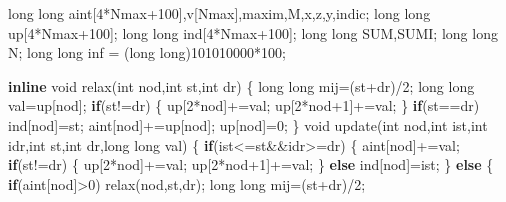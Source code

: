 \documentclass[10pt,]{article}
\newenvironment{Shaded}{}{}
\newcommand{\KeywordTok}[1]{\textcolor[rgb]{0.00,0.44,0.13}{\textbf{{#1}}}}
\newcommand{\DataTypeTok}[1]{\textcolor[rgb]{0.56,0.13,0.00}{{#1}}}
\newcommand{\DecValTok}[1]{\textcolor[rgb]{0.25,0.63,0.44}{{#1}}}
\newcommand{\NormalTok}[1]{{#1}}
\begin{document}
\begin{Shaded}
\begin{Highlighting}[]
\DataTypeTok{long} \DataTypeTok{long} \NormalTok{aint[}\DecValTok{4}\NormalTok{*Nmax}\DecValTok{+100}\NormalTok{],v[Nmax],maxim,M,x,z,y,indic;}
\DataTypeTok{long} \DataTypeTok{long} \NormalTok{up[}\DecValTok{4}\NormalTok{*Nmax}\DecValTok{+100}\NormalTok{];}
\DataTypeTok{long} \DataTypeTok{long} \NormalTok{ind[}\DecValTok{4}\NormalTok{*Nmax}\DecValTok{+100}\NormalTok{];}
\DataTypeTok{long} \DataTypeTok{long} \NormalTok{SUM,SUMI;}
\DataTypeTok{long} \DataTypeTok{long} \NormalTok{N;}
\DataTypeTok{long} \DataTypeTok{long} \NormalTok{inf = (}\DataTypeTok{long} \DataTypeTok{long}\NormalTok{)}\DecValTok{101010000}\NormalTok{*}\DecValTok{100}\NormalTok{;}

\KeywordTok{inline} \DataTypeTok{void} \NormalTok{relax(}\DataTypeTok{int} \NormalTok{nod,}\DataTypeTok{int} \NormalTok{st,}\DataTypeTok{int} \NormalTok{dr) \{}
  \DataTypeTok{long} \DataTypeTok{long} \NormalTok{mij=(st+dr)/}\DecValTok{2}\NormalTok{;}
  \DataTypeTok{long} \DataTypeTok{long} \NormalTok{val=up[nod];}
  \KeywordTok{if}\NormalTok{(st!=dr) \{}
    \NormalTok{up[}\DecValTok{2}\NormalTok{*nod]+=val;}
    \NormalTok{up[}\DecValTok{2}\NormalTok{*nod}\DecValTok{+1}\NormalTok{]+=val;}
  \NormalTok{\}}
  \KeywordTok{if}\NormalTok{(st==dr)}
    \NormalTok{ind[nod]=st;}
  \NormalTok{aint[nod]+=up[nod];}
  \NormalTok{up[nod]=}\DecValTok{0}\NormalTok{;}
\NormalTok{\}}
\DataTypeTok{void} \NormalTok{update(}\DataTypeTok{int} \NormalTok{nod,}\DataTypeTok{int} \NormalTok{ist,}\DataTypeTok{int} \NormalTok{idr,}\DataTypeTok{int} \NormalTok{st,}\DataTypeTok{int} \NormalTok{dr,}\DataTypeTok{long} \DataTypeTok{long} \NormalTok{val) \{}
  \KeywordTok{if}\NormalTok{(ist<=st&&idr>=dr) \{}
    \NormalTok{aint[nod]+=val;}
    \KeywordTok{if}\NormalTok{(st!=dr) \{}
      \NormalTok{up[}\DecValTok{2}\NormalTok{*nod]+=val;}
      \NormalTok{up[}\DecValTok{2}\NormalTok{*nod}\DecValTok{+1}\NormalTok{]+=val;}
    \NormalTok{\}}
    \KeywordTok{else} \NormalTok{ind[nod]=ist;}
  \NormalTok{\} }\KeywordTok{else} \NormalTok{\{}
    \KeywordTok{if}\NormalTok{(aint[nod]>}\DecValTok{0}\NormalTok{)}
      \NormalTok{relax(nod,st,dr);}
    \DataTypeTok{long} \DataTypeTok{long} \NormalTok{mij=(st+dr)/}\DecValTok{2}\NormalTok{;}


\end{Highlighting}
\end{Shaded}
\end{document}
